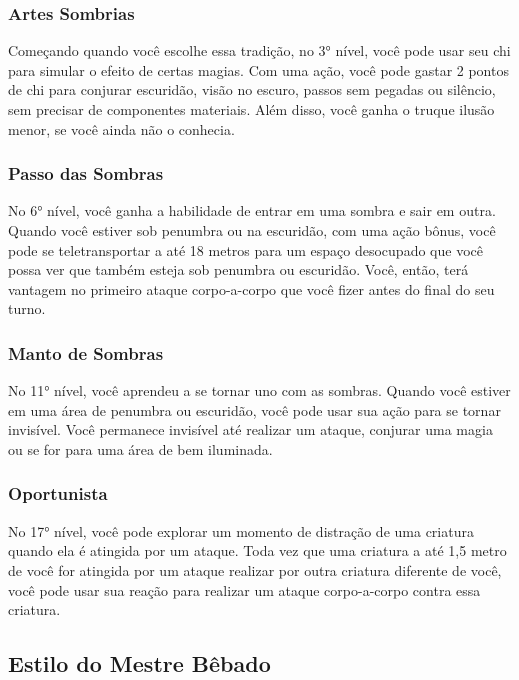 \begin{multicols}{2}
\subsubsection*{Artes Sombrias}%
\label{ssub:artes_sombrias}

Começando quando você escolhe essa tradição, no 3° nível, você pode usar seu chi
para simular o efeito de certas magias. Com uma ação, você pode gastar 2 pontos
de chi para conjurar escuridão, visão no escuro, passos sem pegadas ou silêncio,
sem precisar de componentes materiais. Além disso, você ganha o truque ilusão
menor, se você ainda não o conhecia.

\subsubsection*{Passo das Sombras}%
\label{ssub:passo_das_sombras}

No 6° nível, você ganha a habilidade de entrar em uma sombra e sair em outra.
Quando você estiver sob penumbra ou na escuridão, com uma ação bônus, você pode
se teletransportar a até 18 metros para um espaço desocupado que você possa ver
que também esteja sob penumbra ou escuridão. Você, então, terá vantagem no
primeiro ataque corpo-a-corpo que você fizer antes do final do seu turno.

\subsubsection*{Manto de Sombras}%
\label{ssub:manto_de_sombras}

No 11° nível, você aprendeu a se tornar uno com as sombras. Quando você estiver
em uma área de penumbra ou escuridão, você pode usar sua ação para se tornar
invisível. Você permanece invisível até realizar um ataque, conjurar uma magia
ou se for para uma área de bem iluminada.

\subsubsection*{Oportunista}%
\label{ssub:oportunista}

No 17° nível, você pode explorar um momento de distração de uma criatura quando
ela é atingida por um ataque. Toda vez que uma criatura a até 1,5 metro de você
for atingida por um ataque realizar por outra criatura diferente de você, você
pode usar sua reação para realizar um ataque corpo-a-corpo contra essa
criatura.

\subsection*{Estilo do Mestre Bêbado}%
\label{sub:estilo_do_mestre_bebado}


\end{multicols}
